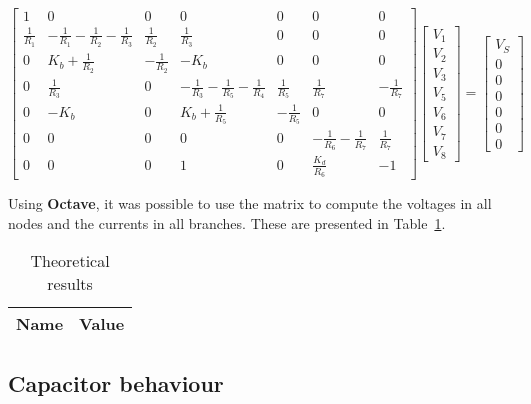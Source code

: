 \begin{equation}
  \begin{bmatrix}
    1 & 0 & 0 & 0 & 0 & 0 & 0 \\
    \frac{1}{R_1} & -\frac{1}{R_1}-\frac{1}{R_2}-\frac{1}{R_3} & \frac{1}{R_2} & \frac{1}{R_3} & 0 & 0 & 0 \\
    0 & K_b + \frac{1}{R_2} & -\frac{1}{R_2} & -K_b & 0 & 0 & 0 \\
    0 & \frac{1}{R_3} & 0 & -\frac{1}{R_3}-\frac{1}{R_5}-\frac{1}{R_4} & \frac{1}{R_5} & \frac{1}{R_7} & -\frac{1}{R_7} \\
    0 & -K_b & 0 & K_b+\frac{1}{R_5} & -\frac{1}{R_5} & 0 & 0 \\
    0 & 0 & 0 & 0 & 0 & -\frac{1}{R_6}-\frac{1}{R_7} & \frac{1}{R_7} \\
    0 & 0 & 0 & 1 & 0 & \frac{K_d}{R_6} & -1     
  \end{bmatrix}
  \begin{bmatrix}
    V_1 \\
    V_2 \\
    V_3 \\
    V_5 \\
    V_6 \\
    V_7 \\
    V_8
  \end{bmatrix}
  =
  \begin{bmatrix}
    V_S \\
    0 \\
    0 \\
    0 \\
    0 \\
    0 \\
    0
  \end{bmatrix}
\end{equation}

Using {\bf Octave}, it was possible to use the matrix to compute the voltages in all nodes and the currents in all branches. These are presented in Table~\ref{node_res}. 

\begin{table}[H]
  \centering
  \begin{tabular}{|c|c|}
    \hline
        {\bf Name} & {\bf Value} \\
        \hline
        \hline
        
        \hline
  \end{tabular}
  \caption{Theoretical results}
  \label{node_res}
\end{table}

\subsection{Capacitor behaviour}
\label{sec:Req}

